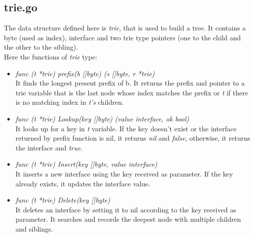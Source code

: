 \subsection{trie.go} 

The data structure defined here is \emph{trie}, that is used to build a tree. It contains a byte (used as index), interface and two trie type pointers (one to the child and the other to the sibling).\\
Here the functions of \emph{trie} type:

\begin{itemize}

\item \emph{func (t *trie) prefix(b []byte) (s []byte, r *trie)}\\
It finds the longest present prefix of b. It returns the prefix and pointer to a trie variable that is the last node whose index matches the prefix or \emph{t} if there is no matching index in \emph{t's} children.

\item \emph{func (t *trie) Lookup(key []byte) (value interface{}, ok bool)}\\
It looks up for a key in \emph{t} variable. If the key doesn't exist or the interface returned by prefix function is nil, it returns \emph{nil} and \emph{false}, otherwise, it returns the interface and \emph{true}.

\item \emph{func (t *trie) Insert(key []byte, value interface{})}\\
It inserts a new interface using the key received as parameter. If the key already exists, it updates the interface value.

\item \emph{func (t *trie) Delete(key []byte)}\\
It deletes an interface by setting it to nil according to the key received as parameter. It searches and records the deepest node with multiple children and siblings.

\end{itemize}